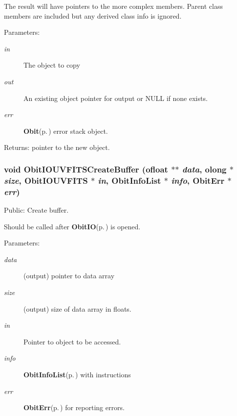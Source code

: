 The result will have pointers to the more complex members. Parent class members are included but any derived class info is ignored. \begin{Desc}
\item[Parameters:]
\begin{description}
\item[{\em in}]The object to copy \item[{\em out}]An existing object pointer for output or NULL if none exists. \item[{\em err}]{\bf Obit}{\rm (p.\,\pageref{structObit})} error stack object. \end{description}
\end{Desc}
\begin{Desc}
\item[Returns:]pointer to the new object. \end{Desc}
\subsubsection{\setlength{\rightskip}{0pt plus 5cm}void Obit\-IOUVFITSCreate\-Buffer ({\bf ofloat} $\ast$$\ast$ {\em data}, {\bf olong} $\ast$ {\em size}, {\bf Obit\-IOUVFITS} $\ast$ {\em in}, {\bf Obit\-Info\-List} $\ast$ {\em info}, {\bf Obit\-Err} $\ast$ {\em err})}\label{ObitIOUVFITS_8c_a37}


Public: Create buffer. 

Should be called after {\bf Obit\-IO}{\rm (p.\,\pageref{structObitIO})} is opened. \begin{Desc}
\item[Parameters:]
\begin{description}
\item[{\em data}](output) pointer to data array \item[{\em size}](output) size of data array in floats. \item[{\em in}]Pointer to object to be accessed. \item[{\em info}]{\bf Obit\-Info\-List}{\rm (p.\,\pageref{structObitInfoList})} with instructions \item[{\em err}]{\bf Obit\-Err}{\rm (p.\,\pageref{structObitErr})} for reporting errors. \end{description}
\end{Desc}
